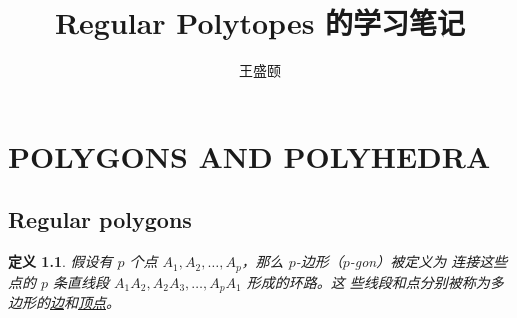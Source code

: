 \documentclass[cs4size,a4paper,adobefonts,openany]{ctexbook}
\newtheorem{defn}{定义}
\newcommand{\pname}[1]{\underline{#1}}
\numberwithin{equation}{section}
\begin{document}
\title{\bfseries Regular Polytopes 的学习笔记}
\author{王盛颐}
\date{}
\maketitle
\setcounter{page}{1}
\chapter{POLYGONS AND POLYHEDRA}
\section{Regular polygons}
\begin{defn}
  假设有 $p$ 个点 $A_1,A_2,\dots,A_p$，那么 $p$-边形（$p$-gon）被定义为
  连接这些点的 $p$ 条直线段 $A_1A_2,A_2A_3,\dots,A_pA_1$ 形成的环路。这
  些线段和点分别被称为多边形的\pname{边}和\pname{顶点}。
\end{defn}
\end{document}
